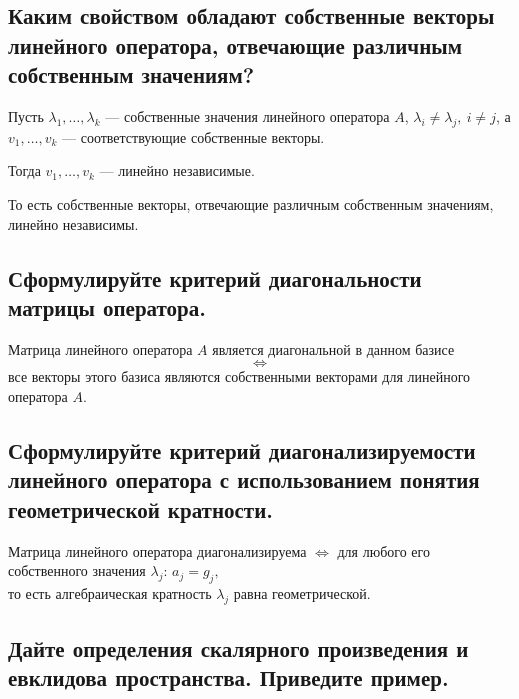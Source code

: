 \subsection{Каким свойством обладают собственные векторы линейного оператора, отвечающие различным собственным значениям?}

\begin{theorem}
    Пусть $\lambda_1, \ldots, \lambda_k$ --- собственные значения линейного оператора $A$,
    $\lambda_i \neq \lambda_j,\ i \neq j$, а $v_1, \ldots, v_k$ --- соответствующие собственные векторы.
    
    Тогда $v_1, \ldots, v_k$ --- линейно независимые.
    
    То есть собственные векторы, отвечающие различным собственным значениям, линейно независимы.
\end{theorem}

\subsection{Сформулируйте критерий диагональности матрицы оператора.}

\begin{theorem}
    Матрица линейного оператора $A$ является диагональной в данном базисе
    \[
        \Longleftrightarrow
    \]
    все векторы этого базиса являются собственными векторами для линейного оператора $A$.
\end{theorem}

\subsection{Сформулируйте критерий диагонализируемости линейного оператора с использованием понятия геометрической кратности.}

\begin{theorem}
    Матрица линейного оператора диагонализируема
    $
        \Longleftrightarrow
    $
    для любого его собственного значения $\lambda_j$:
    $
        a_j = g_j,
    $
    \[
    \]
    то есть алгебраическая кратность $\lambda_j$ равна геометрической.
\end{theorem}



\subsection{Дайте определения скалярного произведения и евклидова пространства. Приведите пример.}

